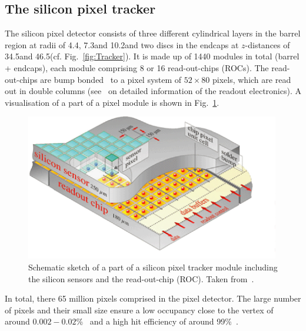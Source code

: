 \subsection*{The silicon pixel tracker}
The silicon pixel detector consists of three different cylindrical layers in the barrel region at radii of 4.4\cm, 7.3\cm and 10.2\cm and two discs in the endcaps at $z$-distances of 34.5\cm and 46.5\cm (cf. Fig.~\ref{fig:Tracker}).
It is made up of 1440 modules in total (barrel + endcaps), each module comprising 8 or 16 read-out-chips (ROCs).
The read-out-chips are bump bonded~\cite{Thesis_Jenny} to a pixel system of $52\times80$ pixels, which are read out in double columns (see~\cite{Thesis_Jenny} on detailed information of the readout electronics).
A visualisation of a part of a pixel module is shown in Fig.~\ref{fig:PixelTracker}.
\begin{figure}[!b]
  \centering
      \includegraphics[width=0.99\textwidth]{figures/experiment/CMS/Pixelement.png}
  \caption{Schematic sketch of a part of a silicon pixel tracker module including the silicon sensors and the read-out-chip (ROC). Taken from~\cite{bib:CMS:tracking_8TeV}.}  
  \label{fig:PixelTracker}
\end{figure}
In total, there 65 million pixels comprised in the pixel detector.
The large number of pixels and their small size ensure a low occupancy close to the vertex of around $0.002 - 0.02$\%~\cite{bib:CMS:tracking_8TeV} and a high hit efficiency of around 99\%~\cite{bib:CMS:PixelSpatialResolution}. 

